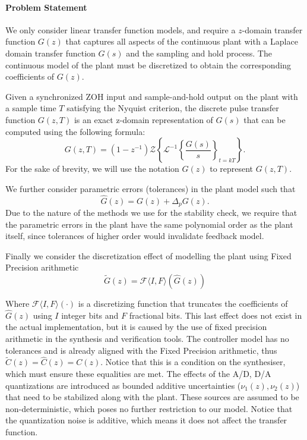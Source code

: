 \documentclass[final]{sig-alternate-05-2015}
\begin{document}
\paragraph{Problem Statement}
We only consider linear transfer function models, and require a $z$-domain transfer
function $G(z)$ that captures all aspects of the continuous plant with a
Laplace domain transfer function $G(s)$ and the sampling and hold process. 
The continuous model of the plant must be discretized to obtain the
corresponding coefficients of $G(z)$.

Given a synchronized ZOH input and sample-and-hold output on the plant with
a sample time $T$ satisfying the Nyquist criterion, the discrete pulse
transfer function $G(z,T)$ is an exact z-domain representation of $G(s)$
that can be computed using the following formula:
%
\begin{equation}
\label{eq:pulsetf}
G(z,T) = (1-z^{-1})\mathcal{Z}\left\lbrace{\mathcal{L}^{-1}\left\lbrace{\frac{G(s)}{s}}\right\rbrace_{t=kT}}\right\rbrace.
\end{equation}
%
For the sake of brevity, we will use the notation $G(z)$ to represent $G(z,T)$.

We further consider parametric errors (tolerances) in the plant model such that
\begin{equation}
\label{eq:tolerancetf}
\hat{G}(z) = G(z)+\Delta_pG(z).
\end{equation}
Due to the nature of the methods we use for the stability check, we require
that the parametric errors in the plant have the same polynomial order as
the plant itself, since tolerances of higher order would invalidate
feedback model.

Finally we consider the discretization effect of modelling the plant using Fixed Precision arithmetic
\begin{equation}
\label{eq:fwltf}
\tilde{G}(z) = \mathcal{F}\langle I,F\rangle(\hat{G}(z))
\end{equation}

Where $\mathcal{F}\langle I,F\rangle(\cdot)$ is a discretizing function that truncates the coefficients of $\hat{G}(z)$ using $I$ integer bits and $F$ fractional bits. This last effect does not exist in the actual implementation, but it is caused by the use of fixed precision arithmetic in the synthesis and verification tools.
The controller model has no tolerances and is already aligned with the Fixed Precision arithmetic, thus $\tilde{C}(z)=\hat{C}(z)=C(z)$. Notice that this is a condition on the synthesiser, which must ensure these equalities are met.
The effects of the A/D, D/A quantizations are introduced as bounded additive uncertainties ($\nu_1(z),\nu_2(z)$) that need to be stabilized along with the plant. These sources are assumed to be non-deterministic, 
which poses no further restriction to our model. Notice that the quantization noise is additive, which means
it does not affect the transfer function.
\end{document}
